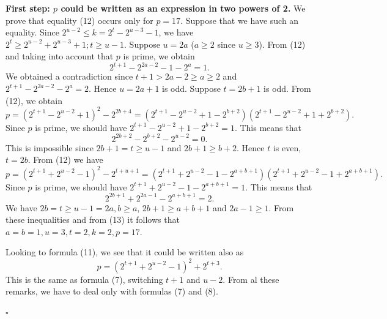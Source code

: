 \documentclass[12pt]{article}
\newenvironment{proof}{{\it Proof.}}{\hfill $ \square $ \vskip 4mm}
\begin{document}
{\begin{proof} {\bf First step: $p$ could be written as an expression in two powers of 2.}
We prove that equality (12) occurs only for $p=17$. Suppose that we have such an equality. Since $2^{u-2}\leq k=2^t-2^{u-3}-1$, we have $2^t\geq 2^{u-2}+2^{u-3}+1; t\geq u-1$. Suppose $u=2a$ ($a\geq 2$ since $u\geq 3$). From (12) and taking into account that $p$ is prime, we obtain
$$2^{t+1}-2^{2a-2}-1-2^a=1.$$ We obtained a contradiction since $t+1>2a-2\geq a\geq 2$ and $2^{t+1}-2^{2a-2}-2^a=2$. Hence $u=2a+1$ is odd. Suppose $t=2b+1$ is odd. From (12), we obtain
$$p=(2^{t+1}-2^{u-2}+1)^2-2^{2b+4}=(2^{t+1}-2^{u-2}+1-2^{b+2})(2^{t+1}-2^{u-2}+1+2^{b+2}).$$ Since $p$ is prime, we should have $2^{t+1}-2^{u-2}+1-2^{b+2}=1$. This means that 
$$2^{2b+2}-2^{b+2}-2^{u-2}=0.$$ This is impossible since $2b+1=t\geq u-1$ and $2b+1\geq b+2$. Hence $t$ is even, $t=2b$. From (12) we have
$$p=(2^{t+1}+2^{u-2}-1)^2-2^{t+u+1}=(2^{t+1}+2^{u-2}-1-2^{a+b+1})(2^{t+1}+2^{u-2}-1+2^{a+b+1}).$$
Since $p$ is prime, we should have $2^{t+1}+2^{u-2}-1-2^{a+b+1}=1$. This means that 
\begin{equation}2^{2b+1}+2^{2a-1}-2^{a+b+1}=2.
\end{equation}We have $2b=t\geq u-1=2a, b\geq a$, $2b+1\geq a+b+1$ and $2a-1\geq 1$. From these inequalities and from (13) it follows that $a=b=1, u=3,t=2,k=2,p=17$. 

Looking to formula (11), we see that it could be written also as
$$p=(2^{t+1}+2^{u-2}-1)^2+2^{t+3}.$$ This is the same as formula (7), switching $t+1$ and $u-2$. From al these remarks, we have to deal only with formulas (7) and (8).


\end{proof}}
\end{document}
